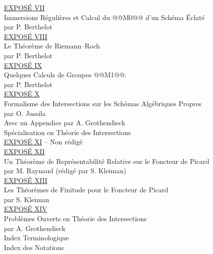 \underline{EXPOSÉ VII}\\
Immersions Régulières et Calcul du @@M0@@ d'un Schéma Éclaté\\
par P. Berthelot \\[8pt]
\underline{EXPOSÉ VIII}\\
Le Théorème de Riemann--Roch\\
par P. Berthelot \\[8pt]
\underline{EXPOSÉ IX}\\
Quelques Calculs de Groupes @@M1@@.\\
par P. Berthelot \\[8pt]
\underline{EXPOSÉ X}\\
Formalisme des Intersections sur les Schémas Algébriques Propres\\
par O. Jussila\\
Avec un Appendice par A. Grothendieck\\
Spécialisation en Théorie des Intersections \\[8pt]
\underline{EXPOSÉ XI} -- Non rédigé\\[8pt]
\underline{EXPOSÉ XII}\\
Un Théorème de Représentabilité Relative sur le Foncteur de Picard\\
par M. Raynaud (rédigé par S. Kleiman) \\[8pt]
\underline{EXPOSÉ XIII}\\
Les Théorèmes de Finitude pour le Foncteur de Picard\\
par S. Kleiman \\[8pt]
\underline{EXPOSÉ XIV}\\
Problèmes Ouverts en Théorie des Intersections\\
par A. Grothendieck \\[8pt]
Index Terminologique \\[4pt]
Index des Notations \par

